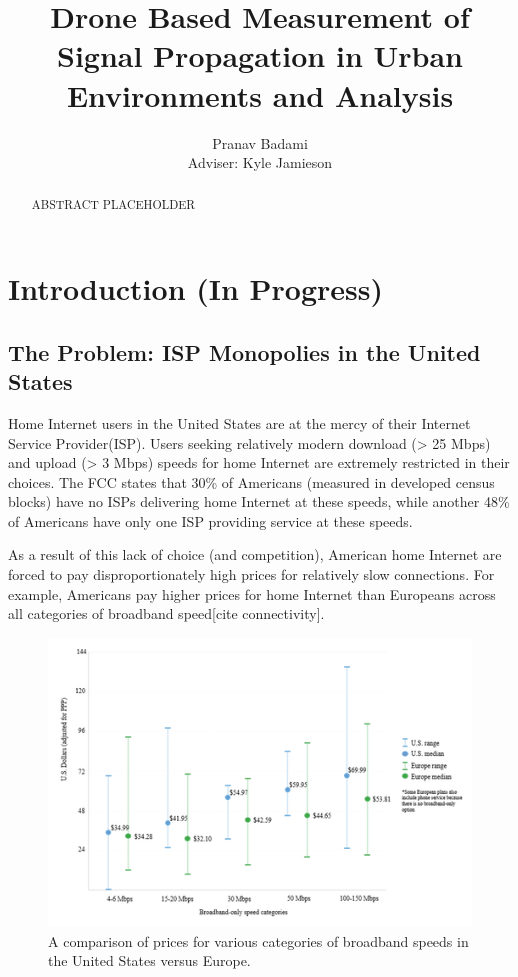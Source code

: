 \documentclass[pageno]{jpaper}
\begin{document}
\title{
Drone Based Measurement of Signal Propagation in Urban Environments and Analysis}

\author{Pranav Badami\\Adviser: Kyle Jamieson}

\date{}
\maketitle

\thispagestyle{empty}
\doublespacing

\begin{abstract}
ABSTRACT PLACEHOLDER
\end{abstract}

\section{Introduction (In Progress)}
\subsection{The Problem: ISP Monopolies in the United States}
Home Internet users in the United States are at the mercy of their Internet Service Provider(ISP). Users seeking relatively modern download (> 25 Mbps) and upload (> 3 Mbps) speeds for home Internet are extremely restricted in their choices. The FCC states that 30\% of Americans (measured in developed census blocks) have no ISPs delivering home Internet at these speeds, while another 48\% of Americans have only one ISP providing service at these speeds\cite{fcc15}.

As a result of this lack of choice (and competition), American home Internet are forced to pay disproportionately high prices for relatively slow connections. For example, Americans pay higher prices for home Internet than Europeans across all categories of broadband speed[cite connectivity].

\begin{figure}[h]
	\caption{A comparison of prices for various categories of broadband speeds in the United States versus Europe.}
	\includegraphics{comparison}
	\centering
\end{figure}
\end{document}
